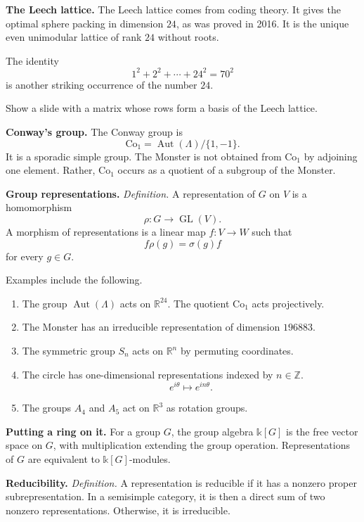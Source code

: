 \medskip\noindent
{\bf The Leech lattice.}
The Leech lattice comes from coding theory.
It gives the optimal sphere packing in
dimension $24$, as was proved in 2016. It is
the unique even unimodular lattice of rank
$24$ without roots.

The identity
$$
1^2+2^2+\cdots+24^2=70^2
$$
is another striking occurrence of the number
$24$.

Show a slide with a matrix whose rows form a
basis of the Leech lattice.

\medskip\noindent
{\bf Conway's group.}
The Conway group is
$$
\mathrm{Co}_1=
\operatorname{Aut}(\Lambda)/\{1,-1\}.
$$
It is a sporadic simple group. The Monster is
not obtained from $\mathrm{Co}_1$ by
adjoining one element. Rather,
$\mathrm{Co}_1$ occurs as a quotient of a
subgroup of the Monster.

\medskip\noindent
{\bf Group representations.}
{\it Definition.} A representation of $G$ on
$V$ is a homomorphism
$$
\rho:G\longrightarrow\operatorname{GL}(V).
$$
A morphism of representations is a linear map
$f:V\longrightarrow W$ such that
$$
f\rho(g)=\sigma(g)f
$$
for every $g\in G$.

Examples include the following.

\begin{enumerate}
\item
The group $\operatorname{Aut}(\Lambda)$ acts
on $\mathbb{R}^{24}$. The quotient
$\mathrm{Co}_1$ acts projectively.

\item
The Monster has an irreducible representation
of dimension $196883$.

\item
The symmetric group $S_n$ acts on
$\mathbb{R}^n$ by permuting coordinates.

\item
The circle has one-dimensional
representations indexed by $n\in\mathbb{Z}$.
$$
e^{i\theta}\longmapsto e^{in\theta}.
$$

\item
The groups $A_4$ and $A_5$ act on
$\mathbb{R}^3$ as rotation groups.
\end{enumerate}

\medskip\noindent
{\bf Putting a ring on it.}
For a group $G$, the group algebra
$\mathbb{k}[G]$ is the free vector space on
$G$, with multiplication extending the group
operation. Representations of $G$ are
equivalent to $\mathbb{k}[G]$-modules.

\medskip\noindent
{\bf Reducibility.}
{\it Definition.} A representation is
reducible if it has a nonzero proper
subrepresentation. In a semisimple category,
it is then a direct sum of two nonzero
representations. Otherwise, it is
irreducible.

